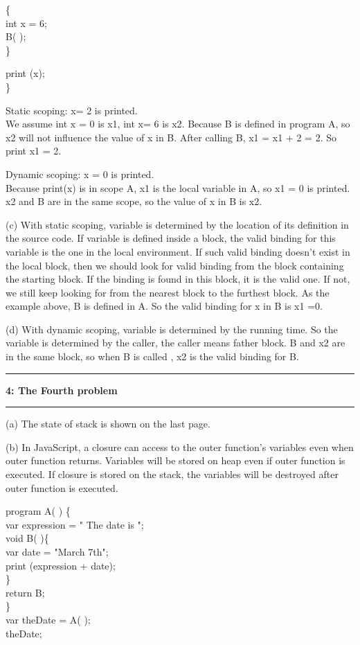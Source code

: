 \documentclass[11pt]{article}
\newcommand\question[2]{\vspace{.25in}\hrule\textbf{#1: #2}\vspace{.5em}\hrule\vspace{.10in}}
\begin{document}
\{\\
int x = 6;\\
B( );\\
\}

print (x);\\
\}


Static scoping: x= 2 is printed.\\ We assume int x = 0 is x1, int x= 6 is x2. Because B is defined in program A, so x2 will not influence the value of x in B.  After calling B, x1 = x1 + 2 = 2. So print x1 = 2.


Dynamic scoping: x = 0 is printed.\\ Because print(x) is in scope A, x1 is the local variable in A, so x1 = 0 is printed. x2 and B are in the same scope, so the value of x in B is x2. 

(c) With static scoping, variable is determined by the location of its definition in the source code. If variable is defined inside a block, the valid binding for this variable is the one in the local environment. If such valid binding doesn't exist in the local block, then we should look for  valid binding from the block containing the starting block. If the binding is found in this block, it is the valid one. If not, we still keep looking for from the nearest block to the furthest block. As the example above, B is defined in A. So the valid binding for x in B is x1 =0.



(d) With dynamic scoping, variable is determined by the running time. So the variable is determined by the caller, the caller means father block. B and x2 are in the same block, so when B is called , x2 is the valid binding for B.

\question{4}{The Fourth problem}

(a) The state of stack is shown on the last page.


(b) In JavaScript, a closure can access to the outer function's variables even when outer function returns. Variables will be stored on heap even if outer function is executed. If closure is stored on the stack, the variables will be destroyed after outer function is executed. 

program A( ) \{\\
\qquad var expression = " The date is ";\\
\qquad void B( )\{\\
\qquad \qquad var date = "March 7th";\\
\qquad \qquad print (expression + date);\\
\qquad \}\\
\qquad return B;\\
\}\\
var theDate = A( );\\
theDate;\\
\end{document}
